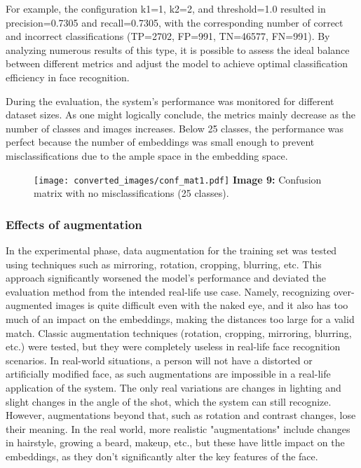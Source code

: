 \documentclass{article}
\begin{document}
\hspace*{1.00cm} For example, the configuration k1=1, k2=2, and threshold=1.0 resulted in precision=0.7305 and recall=0.7305, with the corresponding number of correct and incorrect classifications (TP=2702, FP=991, TN=46577, FN=991). By analyzing numerous results of this type, it is possible to assess the ideal balance between different metrics and adjust the model to achieve optimal classification efficiency in face recognition.

\hspace*{1.00cm}During the evaluation, the system's performance was monitored for different dataset sizes. As one might logically conclude, the metrics mainly decrease as the number of classes and images increases. Below 25 classes, the performance was perfect because the number of embeddings was small enough to prevent misclassifications due to the ample space in the embedding space.

\begin{figure}[H]
    \centering
    \texttt{[image: converted\_images/conf\_mat1.pdf]}
    \textbf{Image 9:} Confusion matrix with no misclassifications (25 classes).
\end{figure}

\subsubsection*{Effects of augmentation}

In the experimental phase, data augmentation\cite{yang2022image} for the training set was tested using techniques such as mirroring, rotation, cropping, blurring, etc. This approach significantly worsened the model's performance and deviated the evaluation method from the intended real-life use case. Namely, recognizing over-augmented images is quite difficult even with the naked eye, and it also has too much of an impact on the embeddings, making the distances too large for a valid match. Classic augmentation techniques (rotation, cropping, mirroring, blurring, etc.) were tested, but they were completely useless in real-life face recognition scenarios. In real-world situations, a person will not have a distorted or artificially modified face, as such augmentations are impossible in a real-life application of the system. The only real variations are changes in lighting and slight changes in the angle of the shot, which the system can still recognize. However, augmentations beyond that, such as rotation and contrast changes, lose their meaning. In the real world, more realistic "augmentations" include changes in hairstyle, growing a beard, makeup, etc., but these have little impact on the embeddings, as they don't significantly alter the key features of the face.
\end{document}
